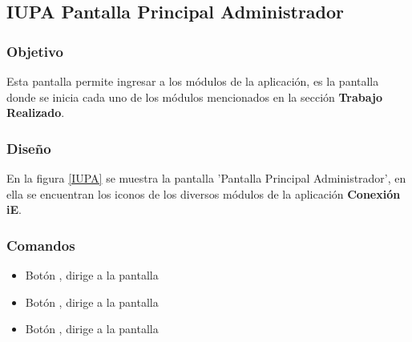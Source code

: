 \subsection{IUPA Pantalla Principal Administrador}

\subsubsection{Objetivo}

	
 	Esta pantalla permite ingresar a los módulos de la aplicación, es la pantalla donde se inicia cada uno de los módulos mencionados en la sección \textbf{Trabajo Realizado}.
\subsubsection{Diseño}


    En la figura \ref{IUPA} se muestra la pantalla 'Pantalla Principal Administrador', en ella se encuentran los iconos de los diversos módulos de la aplicación \textbf{Conexión iE}.



\subsubsection{Comandos}
\begin{itemize}
	
	\item Botón \botSalones, dirige a la pantalla 
	\item Botón \botProfesores, dirige a la pantalla 
	\item Botón \botUnidades, dirige a la pantalla 
\end{itemize}

